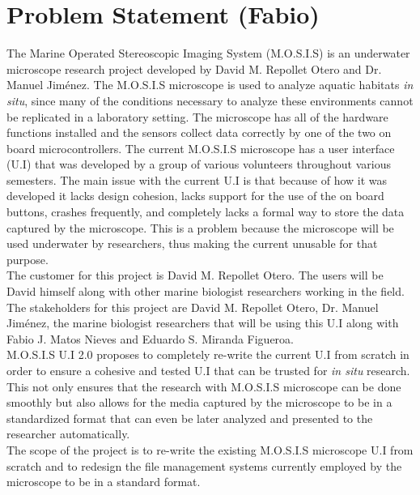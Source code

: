  \section{Problem Statement (Fabio)}
 The Marine Operated Stereoscopic Imaging System (M.O.S.I.S) is an underwater microscope research project developed by David M. Repollet Otero and Dr. Manuel Jiménez\cite{fernandoguzman3UIMosis2023}\cite{Fabiomatos999}. The M.O.S.I.S microscope is used to analyze aquatic habitats \textit{in situ}, since many of the conditions necessary to analyze these environments cannot be replicated in a laboratory setting. The microscope has all of the hardware functions installed and the sensors collect data correctly by one of the two on board microcontrollers. The current M.O.S.I.S microscope has a user interface (U.I) that was developed by a group of various volunteers throughout various semesters. The main issue with the current U.I is that because of how it was developed it lacks design cohesion, lacks support for the use of the on board buttons, crashes frequently, and completely lacks a formal way to store the data captured by the microscope. This is a problem because the microscope will be used underwater by researchers, thus making the current unusable for that purpose.\\
 The customer for this project is David M. Repollet Otero. The users will be David himself along with other marine biologist researchers working in the field. The stakeholders for this project are David M. Repollet Otero, Dr. Manuel Jiménez, the marine biologist researchers that will be using this U.I along with Fabio J. Matos Nieves and Eduardo S. Miranda Figueroa.\\
 M.O.S.I.S U.I 2.0 proposes to completely re-write the current U.I from scratch in order to ensure a cohesive and tested U.I that can be trusted for \textit{in situ} research. This not only ensures that the research with M.O.S.I.S microscope can be done smoothly but also allows for the media captured by the microscope to be in a standardized format that can even be later analyzed and presented to the researcher automatically.\\
The scope of the project is to re-write the existing M.O.S.I.S microscope U.I from scratch and to redesign the file management systems currently employed by the microscope to be in a standard format.